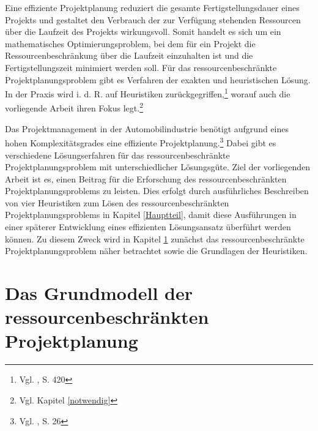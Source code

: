 \documentclass[a4paper,12pt,normalheadings,footexclude,headinclude,liststotoc,nochapterprefix,onecolumn,oneside,parskip,pointlessnumbers]{scrreprt}
\begin{document}
\endgroup
Eine effiziente Projektplanung reduziert die gesamte Fertigstellungsdauer eines Projekts und gestaltet den Verbrauch der zur Verfügung stehenden Ressourcen über die Laufzeit des Projekts wirkungsvoll. Somit handelt es sich um ein mathematisches Optimierungsproblem, bei dem für ein Projekt die Ressourcenbeschränkung über die Laufzeit einzuhalten ist und die Fertigstellungszeit minimiert werden soll.
Für das ressourcenbeschränkte Projektplanungsproblem gibt es Verfahren der exakten und heuristischen Lösung. In der Praxis wird i. d. R. auf Heuristiken zurückgegriffen,\footnote{Vgl. \cite{herroelen2005project}, S. 420} worauf auch die vorliegende Arbeit ihren Fokus legt.\footnote{Vgl. Kapitel \ref{notwendig}}

Das Projektmanagement in der Automobilindustrie benötigt aufgrund eines hohen Komplexitätsgrades eine effiziente Projektplanung.\footnote{Vgl. \cite{luhrig2006risikomanagement1}, S. 26} Dabei gibt es verschiedene Lösungserfahren für das ressourcenbeschränkte Projektplanungsproblem mit unterschiedlicher Lösungsgüte. Ziel der vorliegenden Arbeit ist es, einen Beitrag für die Erforschung des ressourcenbeschränkten Projektplanungsproblems zu leisten. Dies erfolgt durch ausführliches Beschreiben von vier Heuristiken zum Lösen des ressourcenbeschränkten Projektplanungsproblems in Kapitel \ref{Hauptteil}, damit diese Ausführungen in einer späterer Entwicklung eines effizienten Lösungsansatz überführt werden können. Zu diesem Zweck wird in Kapitel \ref{Grundlagen} zunächst das ressourcenbeschränkte Projektplanungsproblem näher betrachtet sowie die Grundlagen der Heuristiken. 



\chapter{Das Grundmodell der ressourcenbeschränkten Projektplanung} \label{Grundlagen}
\end{document}
